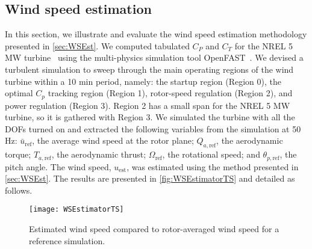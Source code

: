 \documentclass[wes, manuscript]{copernicus}
\begin{document}
\subsection{Wind speed estimation}
\label{sec:WSEstimEx}
In this section, we illustrate and evaluate the wind speed estimation methodology presented in \autoref{sec:WSEst}.
We computed tabulated $C_P$ and $C_T$ for the NREL 5 MW turbine~\citep{nrel5mw} using the multi-physics simulation tool OpenFAST~\citep{openfast}.
We devised a turbulent simulation to sweep through the main operating regions of the wind turbine within a 10 \unit{min} period, namely: the startup region (Region 0), the optimal $C_p$ tracking region (Region 1), rotor-speed regulation (Region 2), and power regulation (Region 3). 
Region 2 has a small span for the NREL 5 MW turbine, so it is gathered with Region 3. 
We simulated the turbine with all the DOFs turned on and extracted the following variables from the simulation at 50 \unit{Hz}: $\bar{u}_\text{ref}$, the average wind speed at the rotor plane; $Q_{a,\text{ref}}$, the aerodynamic torque; $T_{a,\text{ref}}$, the aerodynamic thrust; $\Omega_\text{ref}$, the rotational speed; and $\theta_{p,\text{ref}}$, the pitch angle.
The wind speed, $u_\text{est}$, was estimated using the method presented in \autoref{sec:WSEst}.
The results are presented in \autoref{fig:WSEstimatorTS} and detailed as follows.
% 
\noindent\begin{figure}[!htb]\centering%
  \texttt{[image: WSEstimatorTS]}%
  \caption{Estimated wind speed compared to rotor-averaged wind speed for a reference simulation. 
}\label{fig:WSEstimatorTS}
\end{figure}
% 
    
\end{document}
